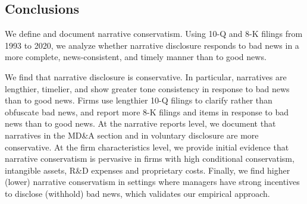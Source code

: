 \documentclass[letterpaper,12pt]{article}
\begin{document}
\begin{spacing}{1.5}
\section{Conclusions}

\noindent We define and document narrative conservatism. Using 10-Q and 8-K filings from 1993 to 2020, we analyze whether narrative disclosure responds to bad news in a more complete, news-consistent, and timely manner than to good news. 

We find that narrative disclosure is conservative. In particular, narratives are lengthier, timelier, and show greater tone consistency in response to bad news than to good news. Firms use lengthier 10-Q filings to clarify rather than obfuscate bad news, and report more 8-K filings and items in response to bad news than to good news. At the narrative reports level, we document that narratives in the MD\&A section and in voluntary disclosure are more conservative. At the firm characteristics level, we provide initial evidence that narrative conservatism is pervasive in firms with high conditional conservatism, intangible assets, R\&D expenses and proprietary costs. Finally, we find higher (lower) narrative conservatism in settings where managers have strong incentives to disclose (withhold) bad news, which validates our empirical approach.


\end{spacing}
\end{document}
